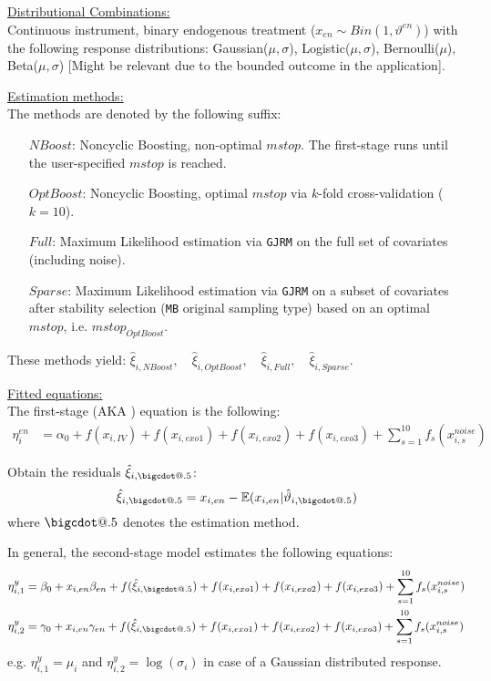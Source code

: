 \documentclass[12pt]{article}
\makeatletter
\newcommand*\bigcdot{\mathpalette\bigcdot@{.5}}
\newcommand*\bigcdot@[2]{\mathbin{\vcenter{\hbox{\scalebox{#2}{$\m@th#1\bullet$}}}}}
\makeatother
\begin{document}
\underline{Distributional Combinations:}\\
Continuous instrument, binary endogenous treatment ($x_{en}\sim Bin(1, \vartheta^{en})$) with the following response distributions: Gaussian($\mu, \sigma$),  Logistic($\mu, \sigma$), Bernoulli($\mu$), Beta($\mu, \sigma$) [Might be relevant due to the bounded outcome in the application].

\underline{Estimation methods:}\\
The methods are denoted by the following suffix: 
\begin{itemize}
\item[${NBoost}$:] Noncyclic Boosting, non-optimal $mstop$. The first-stage runs until the user-specified $mstop$ is reached.
\item[${OptBoost}$:] Noncyclic Boosting, optimal $mstop$ via $k$-fold cross-validation ($k=10$).
\item[${Full}$:] Maximum Likelihood estimation via \texttt{GJRM} on the full set of covariates (including noise).
\item[${Sparse}$:] Maximum Likelihood estimation via \texttt{GJRM} on a subset of covariates after stability selection (\texttt{MB} original sampling type) based on an optimal $mstop$, i.e. $mstop_{OptBoost}$.
\end{itemize}
These methods yield: $\hat{\xi}_{i,NBoost}, \quad \hat{\xi}_{i,OptBoost}, \quad \hat{\xi}_{i,Full}, \quad \hat{\xi}_{i,Sparse}$.

\underline{Fitted equations:} \\
The first-stage (AKA ) equation is the following: 
\begin{align*}
    \eta^{en}_{i} &= \alpha_0 + f(x_{i,IV}) + f(x_{i,exo1}) + f(x_{i,exo2}) + f(x_{i,exo3}) + \sum_{s = 1}^{10} f_s(x^{noise}_{i,s})
\end{align*}

Obtain the residuals $\hat{\xi}_{i,\bigcdot}$:
$$
\hat{\xi}_{i,\bigcdot} = x_{i,en} - \mathbb{E}(x_{i,en}|\hat{\vartheta}_{i,\bigcdot})
$$
where $\bigcdot$ denotes the estimation method.

In general, the second-stage model estimates the following equations: 
\begin{align*}
    \eta^{y}_{i,1} &= \beta_0 + x_{i,en}\beta_{en} + f(\hat{\xi}_{i,\bigcdot}) + f(x_{i,exo1}) + f(x_{i,exo2}) + f(x_{i,exo3}) + \sum_{s = 1}^{10} f_s(x^{noise}_{i,s}) \\
    \eta^{y}_{i,2} &= \gamma_0 + x_{i,en}\gamma_{en} + f(\hat{\xi}_{i,\bigcdot}) + f(x_{i,exo1}) + f(x_{i,exo2}) + f(x_{i,exo3}) + \sum_{s = 1}^{10} f_s(x^{noise}_{i,s}) \\
\end{align*}
e.g. $\eta^{y}_{i,1} = \mu_i$ and $\eta^{y}_{i,2} = \log(\sigma_i)$ in case of a Gaussian distributed response.
\end{document}

